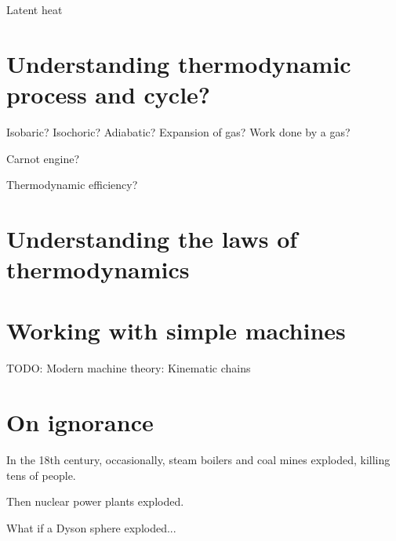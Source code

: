 Latent heat

\section{Understanding thermodynamic process and cycle?}

Isobaric?
Isochoric?
Adiabatic?
Expansion of gas?
Work done by a gas?

Carnot engine?

Thermodynamic efficiency?

\section{Understanding the laws of thermodynamics}


\section{Working with simple machines}



TODO:
Modern machine theory: Kinematic chains

\section{On ignorance}

In the 18th century, occasionally, steam boilers and coal mines exploded, killing tens of people.

Then nuclear power plants exploded.

What if a Dyson sphere exploded...

